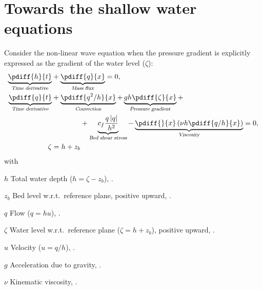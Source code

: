 \chapter{Towards the shallow water equations}\label{sec:1d_swe}
Consider the non-linear wave equation when the pressure gradient is explicitly expressed as the gradient of the water level ($\zeta$):
\begin{subequations}
    \begin{align}
        \underbrace{\pdiff{h}{t}}_{\textsl{Time derivative}} &  +
        \underbrace{\pdiff{q}{x}}_{\textsl{Mass flux}} =0,
        \\
        \underbrace{\pdiff{q}{t}}_{\textsl{Time derivative}} & +
        \underbrace{\pdiff{q^2/h}{x}}_{\textsl{Convection}} +
        \underbrace{gh \pdiff{\zeta}{x}}_{\textsl{Pressure gradient}} +
        \nonumber \\*
        & \qquad \qquad +
        \underbrace{c_f\frac{q\abs{q}}{h^2}}_{\textsl{Bed shear stress}}
        -\underbrace{\pdiff{}{x}\left( \nu h \pdiff{q/h}{x}\right)}_{\textsl{Viscosity}} = 0,
        \\
        \zeta & = h + z_b
    \end{align}
    \label{eq:1d_non_linear_wave2}
\end{subequations}
%
with
\begin{symbollist}
    \item[$h$] Total water depth ($h = \zeta - z_b$), \bunit{\metre}.
    \item[$z_b$] Bed level w.r.t.\ reference plane, positive upward, \bunit{\metre}.
    \item[$q$] Flow ($q = hu$), \bunit{\square\metre\per\second}.
    \item[$\zeta$] Water level w.r.t.\ reference plane ($\zeta = h + z_b$), positive upward, \bunit{\metre}.
    \item[$u$] Velocity ($u = q/h$), \bunit{\metre\per\second}.
    \item[$g$] Acceleration due to gravity, \bunit{\metre\per\square\second}.
    \item[$\nu$] Kinematic viscosity, \bunit{\square\metre\per\second}.
\end{symbollist}

